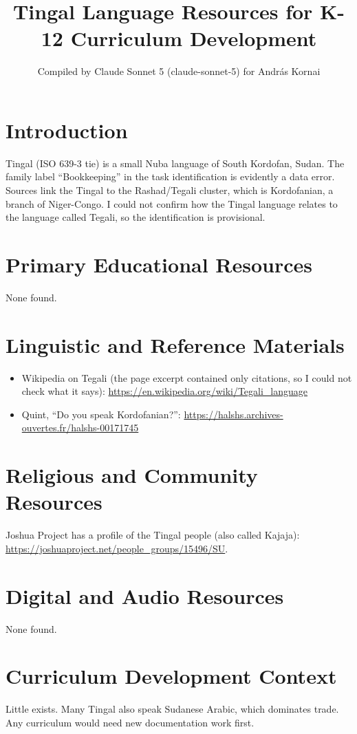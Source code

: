 \documentclass[12pt]{article}
\title{Tingal Language Resources for K-12 Curriculum Development}
\author{Compiled by Claude Sonnet 5 (claude-sonnet-5) for Andr\'as Kornai}
\date{}
\begin{document}
\maketitle
\section{Introduction}
Tingal (ISO 639-3 tie) is a small Nuba language of South Kordofan, Sudan. The family label ``Bookkeeping'' in the task identification is evidently a data error. Sources link the Tingal to the Rashad/Tegali cluster, which is Kordofanian, a branch of Niger-Congo. I could not confirm how the Tingal language relates to the language called Tegali, so the identification is provisional.
\section{Primary Educational Resources}
None found.
\section{Linguistic and Reference Materials}
\begin{itemize}
\item Wikipedia on Tegali (the page excerpt contained only citations, so I could not check what it says): \url{https://en.wikipedia.org/wiki/Tegali_language}
\item Quint, ``Do you speak Kordofanian?'': \url{https://halshs.archives-ouvertes.fr/halshs-00171745}
\end{itemize}
\section{Religious and Community Resources}
Joshua Project has a profile of the Tingal people (also called Kajaja): \url{https://joshuaproject.net/people_groups/15496/SU}.
\section{Digital and Audio Resources}
None found.
\section{Curriculum Development Context}
Little exists. Many Tingal also speak Sudanese Arabic, which dominates trade. Any curriculum would need new documentation work first.
\end{document}
